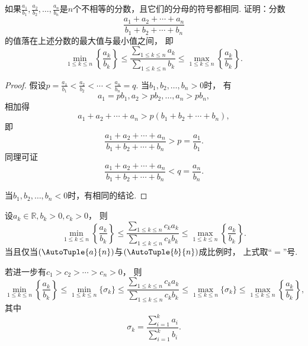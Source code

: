 \begin{example}\label{example:不等式.不同浓度的溶液的混合}
如果\(\frac{a_1}{b_1},\frac{a_2}{b_2},\dotsc,\frac{a_n}{b_n}\)是\(n\)个不相等的分数，且它们的分母的符号都相同.
证明：分数\[
	\frac{a_1+a_2+\dotsb+a_n}{b_1+b_2+\dotsb+b_n}
\]的值落在上述分数的最大值与最小值之间，
即\begin{equation}
	\min_{1 \leq k \leq n}\left\{ \frac{a_k}{b_k} \right\}
	\leq
	\frac{\sum_{1 \leq k \leq n} a_k}{\sum_{1 \leq k \leq n} b_k}
	\leq
	\max_{1 \leq k \leq n}\left\{ \frac{a_k}{b_k} \right\}.
\end{equation}
\begin{proof}
假设\(p=\frac{a_1}{b_1}<\frac{a_2}{b_2}<\dotsb<\frac{a_n}{b_n}=q\).
当\(b_1,b_2,\dotsc,b_n>0\)时，
有\[
	a_1 = p b_1,
	a_2 > p b_2,
	\dotsc,
	a_n > p b_n,
\]
相加得\[
	a_1 + a_2 + \dotsb + a_n > p(b_1 + b_2 + \dotsb + b_n),
\]
即\[
	\frac{a_1+a_2+\dotsb+a_n}{b_1+b_2+\dotsb+b_n} > p = \frac{a_1}{b_1}.
\]
同理可证\[
	\frac{a_1+a_2+\dotsb+a_n}{b_1+b_2+\dotsb+b_n} < q = \frac{a_n}{b_n}.
\]

当\(b_1,b_2,\dotsc,b_n<0\)时，有相同的结论.
\end{proof}
\end{example}
\begin{theorem}
设\(a_k\in\mathbb{R},b_k>0,c_k>0\)，
则\begin{equation}
	\min_{1 \leq k \leq n}\left\{ \frac{a_k}{b_k} \right\}
	\leq
	\frac{
		\sum_{1 \leq k \leq n} c_k a_k
	}{
		\sum_{1 \leq k \leq n} c_k b_k
	}
	\leq
	\max_{1 \leq k \leq n}\left\{ \frac{a_k}{b_k} \right\}.
\end{equation}
当且仅当\((\AutoTuple{a}{n})\)与\((\AutoTuple{b}{n})\)成比例时，
上式取“\(=\)”号.

若进一步有\(c_1 > c_2 > \dotsb > c_n > 0\)，
则\begin{equation}
	\min_{1 \leq k \leq n}\left\{ \frac{a_k}{b_k} \right\}
	\leq
	\min_{1 \leq k \leq n}\{\sigma_k\}
	\leq
	\frac{
		\sum_{1 \leq k \leq n} c_k a_k
	}{
		\sum_{1 \leq k \leq n} c_k b_k
	}
	\leq
	\max_{1 \leq k \leq n}\{\sigma_k\}
	\leq
	\max_{1 \leq k \leq n}\left\{ \frac{a_k}{b_k} \right\},
\end{equation}
其中\[
	\sigma_k = \frac{
		\sum_{i=1}^k a_i
	}{
		\sum_{i=1}^k b_i
	}.
\]
\end{theorem}

